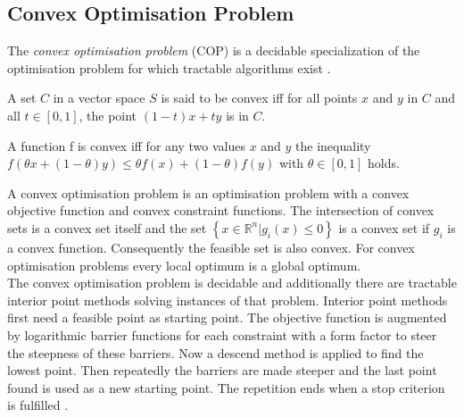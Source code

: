 \subsection{Convex Optimisation Problem}
\label{sec:MathCOP}
The \emph{convex optimisation problem} (COP) is a decidable specialization of the optimisation problem for which tractable algorithms exist \cite{Boyd04ConOpt}.
\begin{definition}
A set $C$ in a vector space $S$ is said to be convex iff for all points $x$ and $y$ in $C$ and all $t\in\left[0,1\right]$, the point $(1-t)x+ty$ is in $C$.
\end{definition}
\begin{definition}
A function f is convex iff for any two values $x$ and $y$ the inequality $ f(\theta x + (1-\theta) y)\leq \theta f(x)+(1-\theta) f(y)$ with $\theta\in \left[0,1\right] $ holds.
\end{definition}
A convex optimisation problem is an optimisation problem with a convex objective function and convex constraint functions. The intersection of convex sets is a convex set itself and the set $\left\lbrace x\in\mathbb{R}^n|g_i(x)\leq 0\right\rbrace$ is a convex set if $g_i$ is a convex function. Consequently the feasible set is also convex. For convex optimisation problems every local optimum is a global optimum.\\
The convex optimisation problem is decidable and additionally there are tractable interior point methods solving instances of that problem. Interior point methods first need a feasible point as starting point. The objective function is augmented by logarithmic barrier functions for each constraint with a form factor to steer the steepness of these barriers. Now a descend method is applied to find the lowest point. Then repeatedly the barriers are made steeper and the last point found is used as a new starting point. The repetition ends when a stop criterion is fulfilled \cite{Boyd04ConOpt}. 
